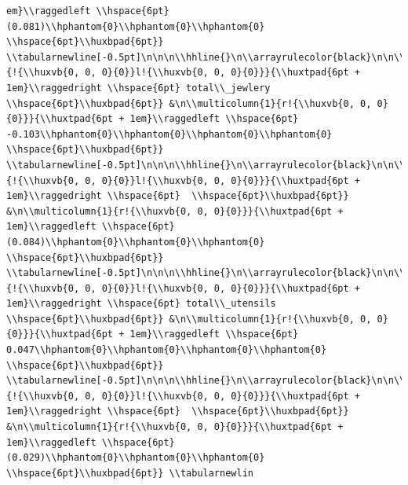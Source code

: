 \documentclass[11pt,preprint, authoryear]{elsarticle}
\numberwithin{equation}{section}
\numberwithin{figure}{section}
\numberwithin{table}{section}
\begin{document}
\begin{verbatim}
em}\\raggedleft \\hspace{6pt} (0.081)\\hphantom{0}\\hphantom{0}\\hphantom{0} \\hspace{6pt}\\huxbpad{6pt}} \\tabularnewline[-0.5pt]\n\n\n\\hhline{}\n\\arrayrulecolor{black}\n\n\\multicolumn{1}{!{\\huxvb{0, 0, 0}{0}}l!{\\huxvb{0, 0, 0}{0}}}{\\huxtpad{6pt + 1em}\\raggedright \\hspace{6pt} total\\_jewlery \\hspace{6pt}\\huxbpad{6pt}} &\n\\multicolumn{1}{r!{\\huxvb{0, 0, 0}{0}}}{\\huxtpad{6pt + 1em}\\raggedleft \\hspace{6pt} -0.103\\hphantom{0}\\hphantom{0}\\hphantom{0}\\hphantom{0} \\hspace{6pt}\\huxbpad{6pt}} \\tabularnewline[-0.5pt]\n\n\n\\hhline{}\n\\arrayrulecolor{black}\n\n\\multicolumn{1}{!{\\huxvb{0, 0, 0}{0}}l!{\\huxvb{0, 0, 0}{0}}}{\\huxtpad{6pt + 1em}\\raggedright \\hspace{6pt}  \\hspace{6pt}\\huxbpad{6pt}} &\n\\multicolumn{1}{r!{\\huxvb{0, 0, 0}{0}}}{\\huxtpad{6pt + 1em}\\raggedleft \\hspace{6pt} (0.084)\\hphantom{0}\\hphantom{0}\\hphantom{0} \\hspace{6pt}\\huxbpad{6pt}} \\tabularnewline[-0.5pt]\n\n\n\\hhline{}\n\\arrayrulecolor{black}\n\n\\multicolumn{1}{!{\\huxvb{0, 0, 0}{0}}l!{\\huxvb{0, 0, 0}{0}}}{\\huxtpad{6pt + 1em}\\raggedright \\hspace{6pt} total\\_utensils \\hspace{6pt}\\huxbpad{6pt}} &\n\\multicolumn{1}{r!{\\huxvb{0, 0, 0}{0}}}{\\huxtpad{6pt + 1em}\\raggedleft \\hspace{6pt} 0.047\\hphantom{0}\\hphantom{0}\\hphantom{0}\\hphantom{0} \\hspace{6pt}\\huxbpad{6pt}} \\tabularnewline[-0.5pt]\n\n\n\\hhline{}\n\\arrayrulecolor{black}\n\n\\multicolumn{1}{!{\\huxvb{0, 0, 0}{0}}l!{\\huxvb{0, 0, 0}{0}}}{\\huxtpad{6pt + 1em}\\raggedright \\hspace{6pt}  \\hspace{6pt}\\huxbpad{6pt}} &\n\\multicolumn{1}{r!{\\huxvb{0, 0, 0}{0}}}{\\huxtpad{6pt + 1em}\\raggedleft \\hspace{6pt} (0.029)\\hphantom{0}\\hphantom{0}\\hphantom{0} \\hspace{6pt}\\huxbpad{6pt}} \\tabularnewlin
\end{verbatim}
\end{document}
